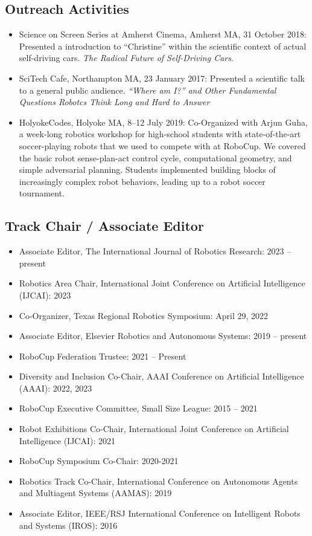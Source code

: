 \documentclass[Times]{article}
\begin{document}
\subsection*{Outreach Activities}
\begin{itemize}
\item Science on Screen Series at Amherst Cinema, Amherst MA, 31 October 2018:
Presented a introduction to ``Christine'' within the scientific context of
actual self-driving cars. \emph{The Radical Future of Self-Driving Cars}.
\item SciTech Cafe, Northampton MA, 23 January 2017: Presented a scientific talk
to a general public audience. \emph{``Where am I?'' and
  Other Fundamental Questions Robotcs Think Long and Hard to Answer}
\item HolyokeCodes, Holyoke MA, 8--12 July 2019: Co-Organized with Arjun Guha, a week-long
robotics workshop for high-school students with state-of-the-art soccer-playing
robots that we used to compete with at RoboCup. We
covered the basic robot sense-plan-act control cycle, computational geometry,
and simple adversarial planning. Students implemented building blocks of
increasingly complex robot behaviors, leading up to a robot soccer tournament.
\end{itemize}

\subsection*{Track Chair / Associate Editor}

\begin{itemize}
  \item Associate Editor, The International Journal of Robotics Research: 2023 -- present
  \item Robotics Area Chair, International Joint Conference on Artificial Intelligence (IJCAI): 2023
  \item Co-Organizer, Texas Regional Robotics Symposium: April 29, 2022
  \item Associate Editor, Elsevier Robotics and Autonomous Systems: 2019 -- present
  \item RoboCup Federation Trustee: 2021 -- Present
  \item Diversity and Inclusion Co-Chair, AAAI Conference on Artificial
  Intelligence (AAAI): 2022, 2023
  \item RoboCup Executive Committee, Small Size League: 2015 -- 2021
  \item Robot Exhibitions Co-Chair, International Joint Conference on Artificial Intelligence (IJCAI): 2021
  \item RoboCup Symposium Co-Chair: 2020-2021
\item Robotics Track Co-Chair, International Conference on Autonomous Agents and
Multiagent Systems (AAMAS): 2019
  \item Associate Editor, IEEE/RSJ International Conference on Intelligent
Robots and Systems (IROS): 2016
\end{itemize}
\end{document}
